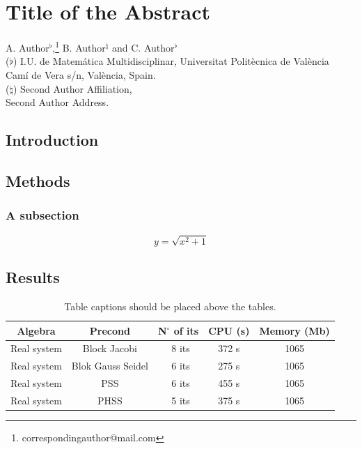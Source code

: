 \documentclass[a4paper,11pt]{book}
\begin{document}
\chapter{Title of the Abstract}

\thispagestyle{empty}
\vspace{-0.5cm}
\begin{center}
\begin{large}
		A. Author$^\flat$,\footnote{correspondingauthor@mail.com}
		B. Author$^\natural$
		and C. Author$^\flat$\\
		\vspace{0.25cm}
		\normalsize ($\flat$)\; I.U. de Matemática Multidisciplinar, Universitat Politècnica de València \\
        \normalsize Camí de Vera s/n, València, Spain.\\ 
        \vspace{0.1cm}
		\normalsize ($\natural$)\;  Second Author Affiliation,\\
        \normalsize Second Author Address.\\ 
\end{large}
\end{center}
\vspace{-0.5cm}

\section{Introduction}

\lipsum[1]


\section{Methods}
\subsection{A subsection}
\lipsum[10]

\begin{equation}
	y= \sqrt{x^2+1}
	\label{eq:equation_example}
\end{equation}

\section{Results}

\lipsum[11]

\begin{table}
	\centering
	\caption{Table captions should be placed above the tables.}
	\begin{tabular}{ccccc}
	\toprule 
	Algebra & Precond & N$^{\circ}$ of its & CPU (s)& Memory (Mb) \\
	\midrule
	Real system	& Block Jacobi      & ~8 its & 372 s & 1065 \\     
	Real system	& Blok Gauss Seidel & ~6 its & 275 s & 1065 \\
	Real system	& PSS               & ~6 its & 455 s & 1065 \\
	Real system	& PHSS              & ~5 its & 375 s & 1065 \\
	\bottomrule 
\end{tabular} 
\end{table}
\end{document}
